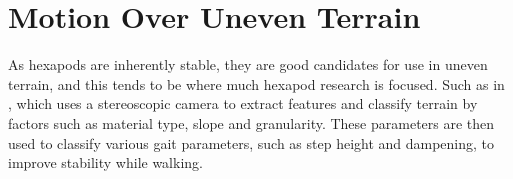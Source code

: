 







\section{Motion Over Uneven Terrain}
    As hexapods are inherently stable, they are good candidates for use in uneven terrain, and this tends to be where much hexapod research is focused.
    Such as in \cite{homberger2017terrain}, which uses a stereoscopic camera to extract features and classify terrain by factors such as material type,
    slope and granularity. These parameters are then used to classify various gait parameters, such as step height and dampening, to improve stability while
    walking.

